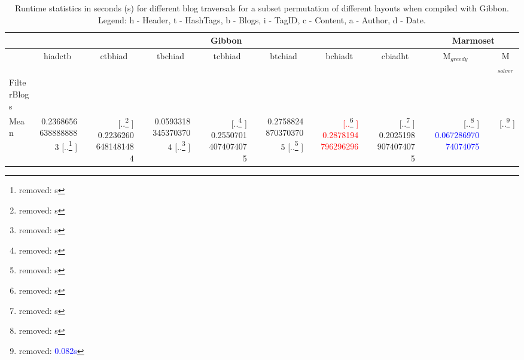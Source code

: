 \documentclass[acmsmall,review,anonymous]{acmart}\settopmatter{printfolios=true,printccs=false,printacmref=false}
\newcommand{\system}{{\sc Marmoset}\xspace}
\newcommand{\systemSolver}{{\sc M$_{\mathit{solver}}$}\xspace} %
\newcommand{\systemGreedy}{{\sc M$_{\mathit{greedy}}$}\xspace} %
\newcommand{\gibbon}{{\sc Gibbon}\xspace}
\newcommand{\ra}[1]{\renewcommand{\arraystretch}{#1}}
\newcommand{\fnumthree}[1]{ {\num[round-mode=places,round-precision=3, scientific-notation=false]{#1}}}
\providecommand{\DIFaddtex}[1]{{\protect\color{blue} \sf #1}} %
\providecommand{\DIFdeltex}[1]{{\protect\color{red} [..\footnote{removed: #1} ]}} %
\providecommand{\DIFaddFL}[1]{\DIFadd{#1}} %
\providecommand{\DIFdelFL}[1]{\DIFdel{#1}} %
\providecommand{\DIFaddbeginFL}{} %
\providecommand{\DIFaddendFL}{} %
\providecommand{\DIFdelbeginFL}{} %
\providecommand{\DIFdelendFL}{} %
\providecommand{\DIFadd}[1]{\texorpdfstring{\DIFaddtex{#1}}{#1}} %
\providecommand{\DIFdel}[1]{\texorpdfstring{\DIFdeltex{#1}}{}} %
\newcommand{\DIFscaledelfig}{0.5}
\newlength{\DIFdelgraphicswidth} %
\newlength{\DIFdelgraphicsheight} %
\newcommand{\DIFaddincludegraphics}[2][]{{\color{blue}\fbox{\DIFOincludegraphics[#1]{#2}}}} %
\newcommand{\DIFdelincludegraphics}[2][]{%
\sbox{\DIFdelgraphicsbox}{\DIFOincludegraphics[#1]{#2}}%
\settoboxwidth{\DIFdelgraphicswidth}{\DIFdelgraphicsbox} %
\settoboxtotalheight{\DIFdelgraphicsheight}{\DIFdelgraphicsbox} %
\scalebox{\DIFscaledelfig}{%
\parbox[b]{\DIFdelgraphicswidth}{\usebox{\DIFdelgraphicsbox}\\[-\baselineskip] \rule{\DIFdelgraphicswidth}{0em}}\llap{\resizebox{\DIFdelgraphicswidth}{\DIFdelgraphicsheight}{%
\setlength{\unitlength}{\DIFdelgraphicswidth}%
\begin{picture}(1,1)%
\thicklines\linethickness{2pt} %
{\color[rgb]{1,0,0}\put(0,0){\framebox(1,1){}}}%
{\color[rgb]{1,0,0}\put(0,0){\line( 1,1){1}}}%
{\color[rgb]{1,0,0}\put(0,1){\line(1,-1){1}}}%
\end{picture}%
}\hspace*{3pt}}} %
} %
\DeclareRobustCommand{\DIFaddbeginFL}{\DIFOaddbeginFL \let\includegraphics\DIFaddincludegraphics} %
\DeclareRobustCommand{\DIFaddendFL}{\DIFOaddendFL \let\includegraphics\DIFOincludegraphics} %
\DeclareRobustCommand{\DIFdelbeginFL}{\DIFOdelbeginFL \let\includegraphics\DIFdelincludegraphics} %
\DeclareRobustCommand{\DIFdelendFL}{\DIFOaddendFL \let\includegraphics\DIFOincludegraphics} %
\begin{document}
\begin{table}[]
\small
\setlength{\tabcolsep}{2pt} \centering
\ra{1}
\caption{Runtime statistics \DIFaddbeginFL \DIFaddFL{in seconds (s) }\DIFaddendFL for different blog traversals for a subset permutation of different layouts when compiled with \gibbon.
 Legend: h - Header, t - HashTags, b - Blogs, i - TagID, c - Content, a - Author, d - Date.}
\begin{tabular}{@{}p{0.6in}rcrcrcrcrcrcrcrcr@{}}\toprule
 & \multicolumn{13}{|c|}{{\gibbon}} &
 & \multicolumn{3}{c|}{{\system}}\\ \midrule

 & \multicolumn{1}{c}{\small{{hiadctb}}} & 
 & \multicolumn{1}{c}{\small{{ctbhiad}}} &
 & \multicolumn{1}{c}{\small{{tbchiad}}} &
 & \multicolumn{1}{c}{\small{{tcbhiad}}} &
 & \multicolumn{1}{c}{\small{{btchiad}}} &
 & \multicolumn{1}{c}{\small{{bchiadt}}} &
 & \multicolumn{1}{c}{\small{{cbiadht}}} &
 & \multicolumn{1}{c}{\small{\systemGreedy}} &
 & \multicolumn{1}{c}{\small{\systemSolver}}\\ \midrule
Filter\:Blogs \\
Mean   & {\DIFdelbeginFL %
\DIFdelendFL \DIFaddbeginFL \fnumthree{0.23686566388888883}\DIFaddendFL }  
        \DIFdelbeginFL \DIFdelFL{s  
        }\DIFdelendFL &&  \DIFdelbeginFL %
\DIFdelFL{s
		}\DIFdelendFL \DIFaddbeginFL \fnumthree{0.22362606481481484}
		\DIFaddendFL &&  {\DIFdelbeginFL %
\DIFdelendFL \DIFaddbeginFL \fnumthree{0.05933183453703704}\DIFaddendFL }
		\DIFdelbeginFL \DIFdelFL{s
		}\DIFdelendFL &&  \DIFdelbeginFL %
\DIFdelFL{s
		}\DIFdelendFL \DIFaddbeginFL \fnumthree{0.25507014074074075}
		\DIFaddendFL && {\DIFdelbeginFL %
\DIFdelendFL \DIFaddbeginFL \fnumthree{0.27588248703703705}\DIFaddendFL }
		\DIFdelbeginFL \DIFdelFL{s
		}\DIFdelendFL &&  \textcolor{red}{\DIFdelbeginFL %
\DIFdelFL{s}\DIFdelendFL \DIFaddbeginFL \fnumthree{0.2878194796296296}\DIFaddendFL }
		&&  \DIFdelbeginFL %
\DIFdelFL{s 
		}\DIFdelendFL \DIFaddbeginFL \fnumthree{0.20251989074074075} 
		\DIFaddendFL &&   \DIFdelbeginFL %
\DIFdelFL{s 
		}\DIFdelendFL \DIFaddbeginFL \DIFaddFL{\textcolor{blue}{\fnumthree{0.06728697074074075}} 
		}\DIFaddendFL &&  \DIFdelbeginFL \DIFdelFL{\textcolor{blue}{{{0.082}}s}
}
\end{tabular}
\end{table}
\end{document}
